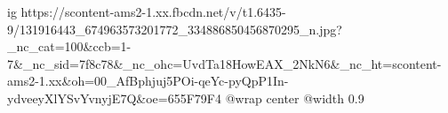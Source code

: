  
 
 
 
 

\ifcmt
  ig https://scontent-ams2-1.xx.fbcdn.net/v/t1.6435-9/131916443_674963573201772_334886850456870295_n.jpg?_nc_cat=100&ccb=1-7&_nc_sid=7f8c78&_nc_ohc=UvdTa18HowEAX_2NkN6&_nc_ht=scontent-ams2-1.xx&oh=00_AfBphjuj5POi-qeYc-pyQpP1In-ydveeyXlYSvYvnyjE7Q&oe=655F79F4
  @wrap center
  @width 0.9
\fi
